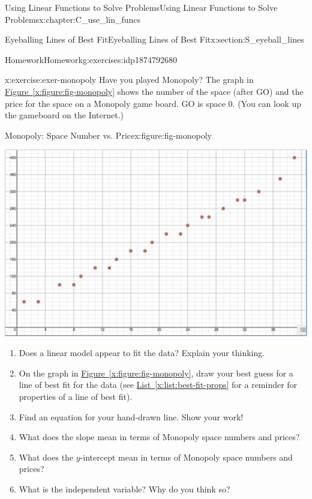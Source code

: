 \documentclass[oneside,10pt,]{book}
\newcommand{\xreffont}{\relax}
\numberwithin{equation}{chapter}
\begin{document}
\begin{chapterptx}{Using Linear Functions to Solve Problems}{}{Using Linear Functions to Solve Problems}{}{}{x:chapter:C_use_lin_funcs}
\begin{sectionptx}{Eyeballing Lines of Best Fit}{}{Eyeballing Lines of Best Fit}{}{}{x:section:S_eyeball_lines}
\begin{exercises-subsection}{Homework}{}{Homework}{}{}{g:exercises:idp1874792680}
%
\begin{divisionexercise}{2}{}{}{x:exercise:exer-monopoly}%
Have you played Monopoly? The graph in \hyperref[x:figure:fig-monopoly]{Figure~{\xreffont\ref{x:figure:fig-monopoly}}} shows the number of the space (after GO) and the price for the space on a Monopoly game board. GO is space 0. (You can look up the gameboard on the Internet.)%
\begin{figureptx}{Monopoly: Space Number vs. Price}{x:figure:fig-monopoly}{}%
\begin{image}{0.125}{0.75}{0.125}%
\includegraphics[width=\linewidth]{external/monopoly.pdf}
\end{image}%
\tcblower
\end{figureptx}%
\begin{enumerate}[font=\bfseries,label=(\alph*),ref=\alph*]
\item{}Does a linear model appear to fit the data? Explain your thinking.%
\item{}On the graph in \hyperref[x:figure:fig-monopoly]{Figure~{\xreffont\ref{x:figure:fig-monopoly}}}, draw your best guess for a line of best fit for the data (see \hyperref[x:list:best-fit-props]{List~{\xreffont\ref{x:list:best-fit-props}}} for a reminder for properties of a line of best fit).%
\item{}Find an equation for your hand-drawn line. Show your work!%
\item{}What does the slope mean in terms of Monopoly space numbers and prices?%
\item{}What does the \(y\)-intercept mean in terms of Monopoly space numbers and prices?%
\item{}What is the independent variable? Why do you think so?%

\end{enumerate}
\end{divisionexercise}
\end{exercises-subsection}
\end{sectionptx}
\end{chapterptx}
\end{document}

